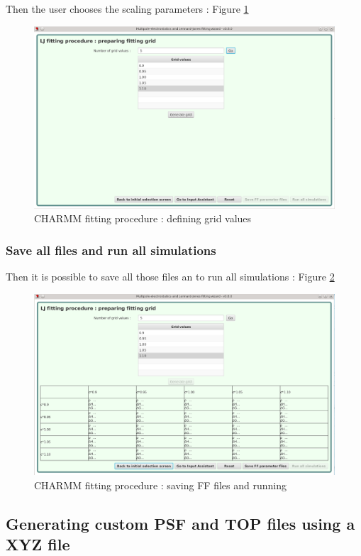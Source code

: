 \documentclass[12pt,a4paper]{article}
\begin{document}
Then the user chooses the scaling parameters : Figure \ref{fig10}\\

\begin{figure}[h!]
\centering
\includegraphics[width=0.9\linewidth]{pics/scr10}
\caption{CHARMM fitting procedure : defining grid values}
\label{fig10}
\end{figure}

\subsubsection{Save all files and run all simulations}

Then it is possible to save all those files an to run all simulations : Figure \ref{fig11}

\begin{figure}[h!]
\centering
\includegraphics[width=0.9\linewidth]{pics/scr11}
\caption{CHARMM fitting procedure : saving FF files and running}
\label{fig11}
\end{figure}

\clearpage

\subsection{Generating custom PSF and TOP files using a XYZ file}
\end{document}

